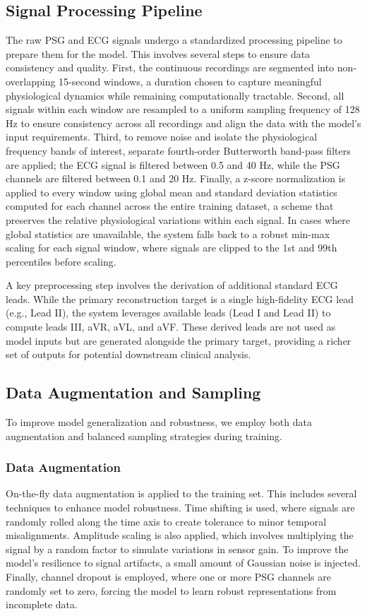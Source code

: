 \documentclass[10pt, conference]{IEEEtran}
\begin{document}
\subsection{Signal Processing Pipeline}
The raw PSG and ECG signals undergo a standardized processing pipeline to prepare them for the model. This involves several steps to ensure data consistency and quality. First, the continuous recordings are segmented into non-overlapping 15-second windows, a duration chosen to capture meaningful physiological dynamics while remaining computationally tractable. Second, all signals within each window are resampled to a uniform sampling frequency of 128 Hz to ensure consistency across all recordings and align the data with the model's input requirements. Third, to remove noise and isolate the physiological frequency bands of interest, separate fourth-order Butterworth band-pass filters are applied; the ECG signal is filtered between 0.5 and 40 Hz, while the PSG channels are filtered between 0.1 and 20 Hz. Finally, a z-score normalization is applied to every window using global mean and standard deviation statistics computed for each channel across the entire training dataset, a scheme that preserves the relative physiological variations within each signal. In cases where global statistics are unavailable, the system falls back to a robust min-max scaling for each signal window, where signals are clipped to the 1st and 99th percentiles before scaling.

A key preprocessing step involves the derivation of additional standard ECG leads. While the primary reconstruction target is a single high-fidelity ECG lead (e.g., Lead II), the system leverages available leads (Lead I and Lead II) to compute leads III, aVR, aVL, and aVF. These derived leads are not used as model inputs but are generated alongside the primary target, providing a richer set of outputs for potential downstream clinical analysis.

\subsection{Data Augmentation and Sampling}
To improve model generalization and robustness, we employ both data augmentation and balanced sampling strategies during training.

\subsubsection{Data Augmentation}
On-the-fly data augmentation is applied to the training set. This includes several techniques to enhance model robustness. Time shifting is used, where signals are randomly rolled along the time axis to create tolerance to minor temporal misalignments. Amplitude scaling is also applied, which involves multiplying the signal by a random factor to simulate variations in sensor gain. To improve the model's resilience to signal artifacts, a small amount of Gaussian noise is injected. Finally, channel dropout is employed, where one or more PSG channels are randomly set to zero, forcing the model to learn robust representations from incomplete data.
\end{document}
